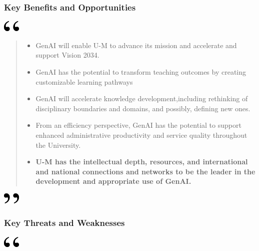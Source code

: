 \documentclass[
]{book}
\begin{document}
\hypertarget{key-benefits-and-opportunities}{%
\subsubsection*{Key Benefits and Opportunities}\label{key-benefits-and-opportunities}}

\includegraphics[width=0.3125in,height=0.20833in]{open.png}

\begin{quote}
\begin{itemize}
\item
  GenAI will enable U-M to advance its mission and accelerate and support Vision 2034.
\item
  GenAI has the potential to transform teaching outcomes by creating customizable learning pathways
\item
  GenAI will accelerate knowledge development,including rethinking of disciplinary boundaries and domains, and possibly, defining new ones.
\item
  From an efficiency perspective, GenAI has the potential to support enhanced administrative productivity and service quality throughout the University.
\item
  \textbf{U-M has the intellectual depth, resources, and international and national connections and networks to be the leader in the development and appropriate use of GenAI.}
\end{itemize}
\end{quote}

\includegraphics[width=0.3125in,height=0.20833in]{close.png}

\hypertarget{key-threats-and-weaknesses}{%
\subsubsection*{Key Threats and Weaknesses}\label{key-threats-and-weaknesses}}

\includegraphics[width=0.3125in,height=0.20833in]{open.png}
\end{document}
